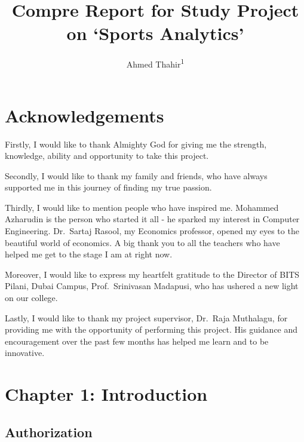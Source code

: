 \documentclass[
  english,
  doc,floatsintext]{apa6}
\title{Compre Report for Study Project on `Sports Analytics'}
\author{Ahmed Thahir\textsuperscript{1}}
\date{}
\affiliation{\vspace{0.5cm}\textsuperscript{1} BITS Pilani Dubai Campus}
\begin{document}
\maketitle



\newpage
{}

\hypertarget{acknowledgements}{%
\section{Acknowledgements}\label{acknowledgements}}

Firstly, I would like to thank Almighty God for giving me the strength, knowledge, ability and opportunity to take this project.

Secondly, I would like to thank my family and friends, who have always supported me in this journey of finding my true passion.

Thirdly, I would like to mention people who have inspired me. Mohammed Azharudin is the person who started it all - he sparked my interest in Computer Engineering. Dr.~Sartaj Rasool, my Economics professor, opened my eyes to the beautiful world of economics. A big thank you to all the teachers who have helped me get to the stage I am at right now.

Moreover, I would like to express my heartfelt gratitude to the Director of BITS Pilani, Dubai Campus, Prof.~Srinivasan Madapusi, who has ushered a new light on our college.

Lastly, I would like to thank my project supervisor, Dr.~Raja Muthalagu, for providing me with the opportunity of performing this project. His guidance and encouragement over the past few months has helped me learn and to be innovative.

\newpage
\tableofcontents

\newpage
\listoffigures
\listoftables

\newpage
{}

\hypertarget{chapter-1-introduction}{%
\section{Chapter 1: Introduction}\label{chapter-1-introduction}}

\hypertarget{authorization}{%
\subsection{Authorization}\label{authorization}}
\end{document}
